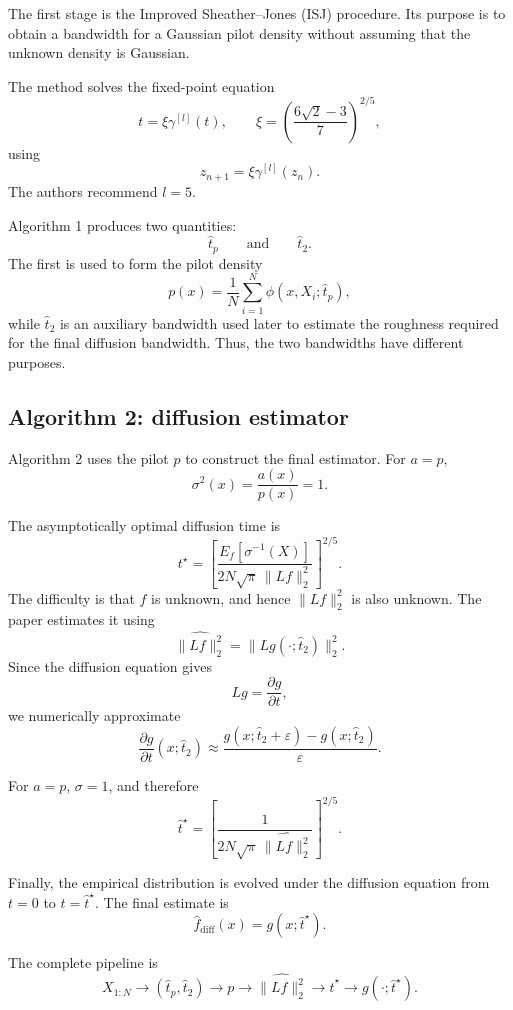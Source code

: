 \documentclass{article}
\begin{document}
The first stage is the Improved Sheather--Jones (ISJ) procedure. Its
purpose is to obtain a bandwidth for a Gaussian pilot density without
assuming that the unknown density is Gaussian.

The method solves the fixed-point equation
\[
t=\xi\gamma^{[l]}(t),
\qquad
\xi
=
\left(
\frac{6\sqrt{2}-3}{7}
\right)^{2/5},
\]
using
\[
z_{n+1}=\xi\gamma^{[l]}(z_n).
\]
The authors recommend $l=5$.

Algorithm 1 produces two quantities:
\[
\widehat t_p
\qquad\text{and}\qquad
\widehat t_2.
\]
The first is used to form the pilot density
\[
p(x)
=
\frac{1}{N}
\sum_{i=1}^{N}
\phi(x,X_i;\widehat t_p),
\]
while $\widehat t_2$ is an auxiliary bandwidth used later to estimate
the roughness required for the final diffusion bandwidth. Thus, the two
bandwidths have different purposes.


\subsection{Algorithm 2: diffusion estimator}

Algorithm 2 uses the pilot $p$ to construct the final estimator. For
$a=p$,
\[
\sigma^2(x)=\frac{a(x)}{p(x)}=1.
\]

The asymptotically optimal diffusion time is
\[
t^\star
=
\left[
\frac{
E_f[\sigma^{-1}(X)]
}{
2N\sqrt{\pi}\,
\|Lf\|_2^2
}
\right]^{2/5}.
\]
The difficulty is that $f$ is unknown, and hence $\|Lf\|_2^2$ is also
unknown. The paper estimates it using
\[
\widehat{\|Lf\|_2^2}
=
\|Lg(\cdot;\widehat t_2)\|_2^2.
\]
Since the diffusion equation gives
\[
Lg=\frac{\partial g}{\partial t},
\]
we numerically approximate
\[
\frac{\partial g}{\partial t}
(x;\widehat t_2)
\approx
\frac{
g(x;\widehat t_2+\varepsilon)
-
g(x;\widehat t_2)
}{
\varepsilon
}.
\]

For $a=p$, $\sigma=1$, and therefore
\[
\widehat t^\star
=
\left[
\frac{
1
}{
2N\sqrt{\pi}\,
\widehat{\|Lf\|_2^2}
}
\right]^{2/5}.
\]

Finally, the empirical distribution is evolved under the diffusion
equation from $t=0$ to $t=\widehat t^\star$. The final estimate is
\[
\boxed{
\widehat f_{\mathrm{diff}}(x)
=
g(x;\widehat t^\star).
}
\]

The complete pipeline is
\[
X_{1:N}
\longrightarrow
(\widehat t_p,\widehat t_2)
\longrightarrow
p
\longrightarrow
\widehat{\|Lf\|_2^2}
\longrightarrow
\widehat t^\star
\longrightarrow
g(\cdot;\widehat t^\star).
\]


\end{document}
